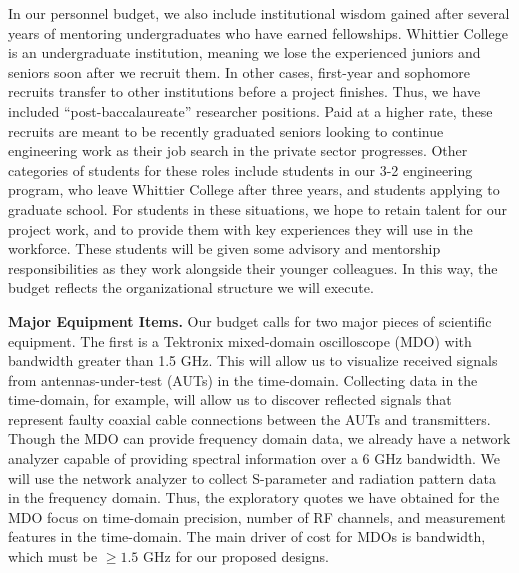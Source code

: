 \documentclass[../../main.tex]{subfiles}
\begin{document}
In our personnel budget, we also include institutional wisdom gained after several years of mentoring undergraduates who have earned fellowships.  Whittier College is an undergraduate institution, meaning we lose the experienced juniors and seniors soon after we recruit them.  In other cases, first-year and sophomore recruits transfer to other institutions before a project finishes.  Thus, we have included ``post-baccalaureate'' researcher positions.  Paid at a higher rate, these recruits are meant to be recently graduated seniors looking to continue engineering work as their job search in the private sector progresses.  Other categories of students for these roles include students in our 3-2 engineering program, who leave Whittier College after three years, and students applying to graduate school. For students in these situations, we hope to retain talent for our project work, and to provide them with key experiences they will use in the workforce.  These students will be given some advisory and mentorship responsibilities as they work alongside their younger colleagues.  In this way, the budget reflects the organizational structure we will execute. \\ \vspace{2.5mm}

\textbf{Major Equipment Items.} Our budget calls for two major pieces of scientific equipment.  The first is a Tektronix mixed-domain oscilloscope (MDO) with bandwidth greater than 1.5 GHz.  This will allow us to visualize received signals from antennas-under-test (AUTs) in the time-domain.  Collecting data in the time-domain, for example, will allow us to discover reflected signals that represent faulty coaxial cable connections between the AUTs and transmitters.  Though the MDO can provide frequency domain data, we already have a network analyzer capable of providing spectral information over a 6 GHz bandwidth.  We will use the network analyzer to collect S-parameter and radiation pattern data in the frequency domain.  Thus, the exploratory quotes we have obtained for the MDO focus on time-domain precision, number of RF channels, and measurement features in the time-domain.  The main driver of cost for MDOs is bandwidth, which must be $\geq 1.5$ GHz for our proposed designs. \\ \vspace{2.5mm}
\end{document}
